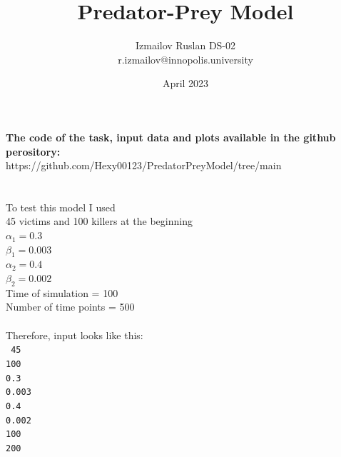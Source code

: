 \documentclass{article}
\title{Predator-Prey Model}
\author{ Izmailov Ruslan DS-02 \\ r.izmailov@innopolis.university }
\date{April 2023}
\begin{document}
\maketitle

\textbf{The code of the task, input data and plots available in the github perository: }\\
https://github.com/Hexy00123/PredatorPreyModel/tree/main \\ \\ \\ 

To test this model I used \\
45 victims and 100 killers at the beginning \\ 
$\alpha_1 = 0.3$\\
$\beta_1 = 0.003$\\ 
$\alpha_2 = 0.4$\\ 
$\beta_2 = 0.002$\\ 
Time of simulation = 100\\
Number of time points = 500\\ \\ 
Therefore, input looks like this: \\ 
\texttt{
45 \\
100 \\
0.3 \\ 
0.003 \\ 
0.4 \\ 
0.002 \\ 
100 \\ 
200 \\ 
}
\end{document}
